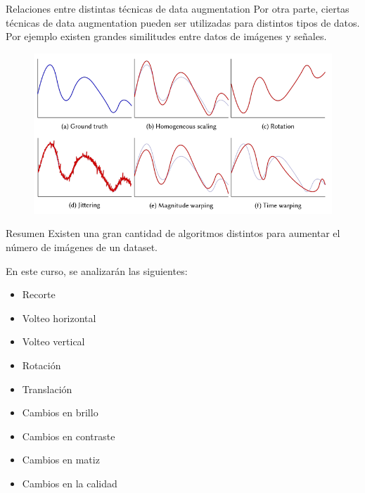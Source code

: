 \begin{frame}{Relaciones entre distintas técnicas de data augmentation}
Por otra parte, ciertas técnicas de data augmentation pueden ser utilizadas para \alert{distintos tipos de datos}. Por ejemplo existen grandes \alert{similitudes} entre datos de \alert{imágenes} y \alert{señales}.

\begin{figure}
    \centering
    \includegraphics[width=\textwidth]{Slides/figures/Tema 3/DA_Signals.png}
    \caption{\cite{iglesias2023data}}
\end{figure}
\end{frame}

\begin{frame}{Resumen}
Existen una gran cantidad de algoritmos distintos para aumentar el número de imágenes de un dataset.

En este curso, se analizarán las siguientes:
\begin{itemize}
    \item \alert{Recorte}
    \item \alert{Volteo horizontal}
    \item \alert{Volteo vertical}
    \item \alert{Rotación}
    \item \alert{Translación}
    \item \alert{Cambios en brillo}
    \item \alert{Cambios en contraste}
    \item \alert{Cambios en matiz}
    \item \alert{Cambios en la calidad}
\end{itemize}
\end{frame}

